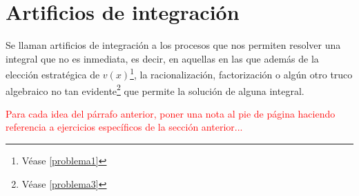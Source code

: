\section{Artificios de integración}\label{sec4}
Se llaman artificios de integración a los procesos que nos permiten resolver una integral que no es inmediata, es decir, en aquellas en las que además de la elección estratégica de $v(x)$\footnote{Véase \cref{problema1}}, la racionalización, factorización o algún otro truco algebraico no tan evidente\footnote{Véase \cref{problema3}} que permite la solución de alguna integral.

\textcolor{red}{Para cada idea del párrafo anterior, poner una nota al pie de página haciendo referencia a ejercicios específicos de la sección anterior...}











